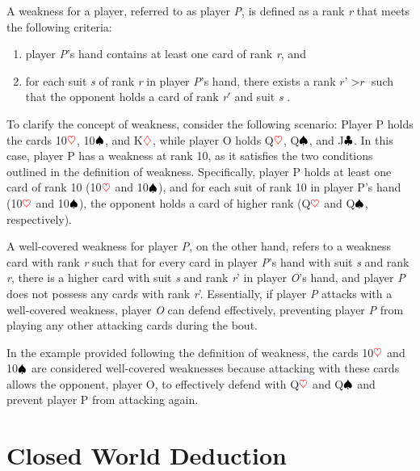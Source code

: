 A weakness for a player, referred to as player \textit{P}, is defined as a rank \textit{r} that meets the following criteria: 
\begin{enumerate}
	\item player \textit{P}'s hand contains at least one card of rank \textit{r}, and
	\item for each suit \textit{s} of rank \textit{r} in player \textit{P}'s hand, there exists a rank $\textit{r}$'$ > \textit{r}$ such that the opponent holds a card of rank \textit{r}$'$ and suit \textit{s} \citep{Bonnet2016TheCO}.
\end{enumerate}

To clarify the concept of weakness, consider the following scenario: Player P holds the cards 10$\textcolor{red}{\heartsuit}$, 10$\textcolor{black}{\spadesuit}$, and K$\textcolor{red}{\diamondsuit}$, while player O holds Q$\textcolor{red}{\heartsuit}$, Q$\textcolor{black}{\spadesuit}$, and J$\textcolor{black}{\clubsuit}$. In this case, player P has a weakness at rank 10, as it satisfies the two conditions outlined in the definition of weakness. Specifically, player P holds at least one card of rank 10 (10$\textcolor{red}{\heartsuit}$ and 10$\textcolor{black}{\spadesuit}$), and for each suit of rank 10 in player P's hand (10$\textcolor{red}{\heartsuit}$ and 10$\textcolor{black}{\spadesuit}$), the opponent holds a card of higher rank (Q$\textcolor{red}{\heartsuit}$ and Q$\textcolor{black}{\spadesuit}$, respectively).

A well-covered weakness for player \textit{P}, on the other hand, refers to a weakness card with rank \textit{r} such that for every card in player \textit{P}'s hand with suit \textit{s} and rank \textit{r}, there is a higher card with suit \textit{s} and rank \textit{r}' in player \textit{O}'s hand, and player \textit{P} does not possess any cards with rank \textit{r}'. Essentially, if player \textit{P} attacks with a well-covered weakness, player \textit{O} can defend effectively, preventing player \textit{P} from playing any other attacking cards during the bout.

In the example provided following the definition of weakness, the cards 10$\textcolor{red}{\heartsuit}$ and 10$\textcolor{black}{\spadesuit}$ are considered well-covered weaknesses because attacking with these cards allows the opponent, player O, to effectively defend with Q$\textcolor{red}{\heartsuit}$ and Q$\textcolor{black}{\spadesuit}$ and prevent player P from attacking again.

\section{Closed World Deduction}

